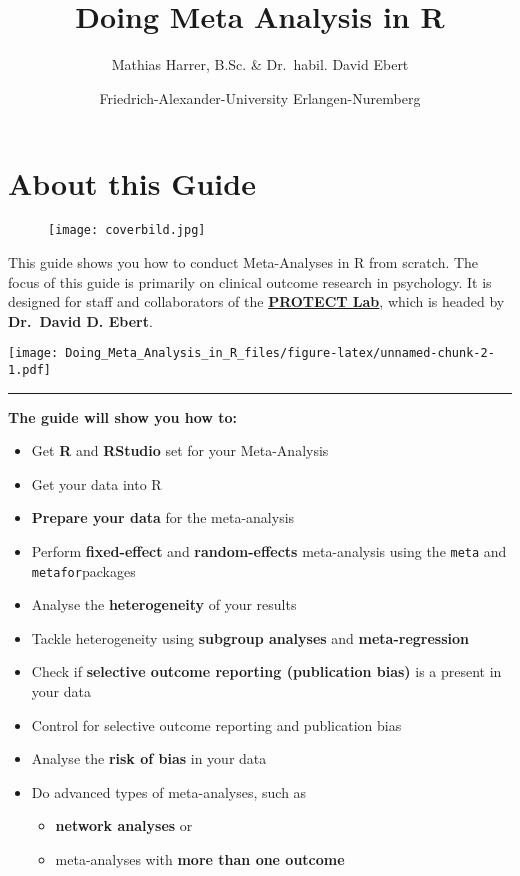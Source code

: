 \documentclass[]{book}
\title{Doing Meta Analysis in R}
\author{Mathias Harrer, B.Sc. \& Dr.~habil. David Ebert}
\date{Friedrich-Alexander-University Erlangen-Nuremberg}
\providecommand{\tightlist}{%
  \setlength{\itemsep}{0pt}\setlength{\parskip}{0pt}}
\theoremstyle{definition}
\theoremstyle{definition}
\theoremstyle{definition}
\theoremstyle{remark}
\begin{document}
\maketitle

{
\setcounter{tocdepth}{1}
\tableofcontents
}
\chapter{About this Guide}\label{about-this-guide}

\begin{figure}
\centering
\texttt{[image: coverbild.jpg]}
\caption{}
\end{figure}

\begin{rmdinfo}
This guide shows you how to conduct Meta-Analyses in R from scratch. The
focus of this guide is primarily on clinical outcome research in
psychology. It is designed for staff and collaborators of the
\href{https://www.protectlab.org}{\textbf{PROTECT Lab}}, which is headed
by \textbf{Dr.~David D. Ebert}.
\end{rmdinfo}

\texttt{[image: Doing\_Meta\_Analysis\_in\_R\_files/figure-latex/unnamed-chunk-2-1.pdf]}

\begin{center}\rule{0.5\linewidth}{\linethickness}\end{center}

\textbf{The guide will show you how to:}

\begin{itemize}
\tightlist
\item
  Get \textbf{R} and \textbf{RStudio} set for your Meta-Analysis
\item
  Get your data into R
\item
  \textbf{Prepare your data} for the meta-analysis
\item
  Perform \textbf{fixed-effect} and \textbf{random-effects}
  meta-analysis using the \texttt{meta} and \texttt{metafor}packages
\item
  Analyse the \textbf{heterogeneity} of your results
\item
  Tackle heterogeneity using \textbf{subgroup analyses} and
  \textbf{meta-regression}
\item
  Check if \textbf{selective outcome reporting (publication bias)} is a
  present in your data
\item
  Control for selective outcome reporting and publication bias
\item
  Analyse the \textbf{risk of bias} in your data
\item
  Do advanced types of meta-analyses, such as

  \begin{itemize}
  \tightlist
  \item
    \textbf{network analyses} or
  \item
    meta-analyses with \textbf{more than one outcome}
  \end{itemize}
\end{itemize}
\end{document}
